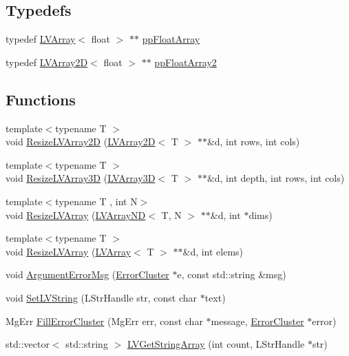 \subsection*{Typedefs}
\begin{DoxyCompactItemize}
\item 
typedef \hyperlink{struct_l_v_1_1_l_v_array}{L\+V\+Array}$<$ float $>$ $\ast$$\ast$ \hyperlink{namespace_l_v_ac1131b71124960a08f07482e546c7875}{pp\+Float\+Array}
\item 
typedef \hyperlink{struct_l_v_1_1_l_v_array2_d}{L\+V\+Array2D}$<$ float $>$ $\ast$$\ast$ \hyperlink{namespace_l_v_acadfd900f4f51673eb24d19b7dda7fcd}{pp\+Float\+Array2}
\end{DoxyCompactItemize}
\subsection*{Functions}
\begin{DoxyCompactItemize}
\item 
{\footnotesize template$<$typename T $>$ }\\void \hyperlink{namespace_l_v_a35dece3a137e6052d33d7d1bad281eb6}{Resize\+L\+V\+Array2D} (\hyperlink{struct_l_v_1_1_l_v_array2_d}{L\+V\+Array2D}$<$ T $>$ $\ast$$\ast$\&d, int rows, int cols)
\item 
{\footnotesize template$<$typename T $>$ }\\void \hyperlink{namespace_l_v_ab09deee5389a6748279391173d8c343a}{Resize\+L\+V\+Array3D} (\hyperlink{struct_l_v_1_1_l_v_array3_d}{L\+V\+Array3D}$<$ T $>$ $\ast$$\ast$\&d, int depth, int rows, int cols)
\item 
{\footnotesize template$<$typename T , int N$>$ }\\void \hyperlink{namespace_l_v_a6ed43b5355dbe802664ba4e5ac3cf626}{Resize\+L\+V\+Array} (\hyperlink{struct_l_v_1_1_l_v_array_n_d}{L\+V\+Array\+ND}$<$ T, N $>$ $\ast$$\ast$\&d, int $\ast$dims)
\item 
{\footnotesize template$<$typename T $>$ }\\void \hyperlink{namespace_l_v_a528a4916cb999c91d85ad90ccbacab0e}{Resize\+L\+V\+Array} (\hyperlink{struct_l_v_1_1_l_v_array}{L\+V\+Array}$<$ T $>$ $\ast$$\ast$\&d, int elems)
\item 
void \hyperlink{namespace_l_v_a9e43dd33c58e4f95da38d6d0298b2477}{Argument\+Error\+Msg} (\hyperlink{struct_l_v_1_1_error_cluster}{Error\+Cluster} $\ast$e, const std\+::string \&msg)
\item 
void \hyperlink{namespace_l_v_a7f34e4a11fe67bd216609c23d6cf8265}{Set\+L\+V\+String} (L\+Str\+Handle str, const char $\ast$text)
\item 
Mg\+Err \hyperlink{namespace_l_v_adb750146d404b2540625c797cfde7f10}{Fill\+Error\+Cluster} (Mg\+Err err, const char $\ast$message, \hyperlink{struct_l_v_1_1_error_cluster}{Error\+Cluster} $\ast$error)
\item 
std\+::vector$<$ std\+::string $>$ \hyperlink{namespace_l_v_a686fa8204cfe39591f34ad5cd93618da}{L\+V\+Get\+String\+Array} (int count, L\+Str\+Handle $\ast$str)
\end{DoxyCompactItemize}


